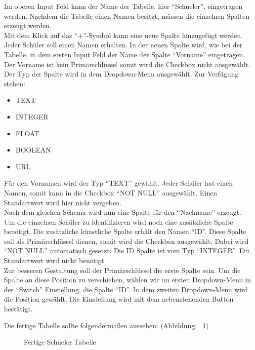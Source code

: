\begin{description}
Im oberen Input Feld kann der Name der Tabelle, hier ``Schueler'', eingetragen werden. Nachdem die Tabelle einen Namen besitzt, müssen die einzelnen Spalten erzeugt werden. \\
Mit dem Klick auf das ``+''-Symbol kann eine neue Spalte hinzugefügt werden. Jeder Schüler soll einen Namen erhalten. 
In der neuen Spalte wird, wie bei der Tabelle, in dem ersten Input Feld der Name der Spalte ``Vorname'' eingetragen. Der Vorname ist kein Primärschlüssel somit wird die Checkbox nicht ausgewählt. Der Typ der Spalte wird in dem Dropdown-Menu ausgewählt. Zur Verfügung stehen:
\begin{itemize}
    \item TEXT
    \item INTEGER
    \item FLOAT
    \item BOOLEAN
    \item URL
\end{itemize} 
Für den Vornamen wird der Typ ``TEXT'' gewählt.
Jeder Schüler hat einen Namen, somit kann in die Checkbox ``NOT NULL'' ausgewählt. Einen Standartwert wird hier nicht vergeben. \\
Nach dem gleichen Schema wird nun eine Spalte für den ``Nachname'' erzeugt.
Um die einzelnen Schüler zu identifizieren wird noch eine zusätzliche Spalte benötigt.
Die zusätzliche künstliche Spalte erhält den Namen ``ID''. Diese Spalte soll als Primärschlüssel dienen, somit wird die Checkbox ausgewählt. Dabei wird ``NOT NULL'' automatisch gesetzt. Die ID Spalte ist vom Typ ``INTEGER''. Ein Standartwert wird nicht benötigt. \\
Zur besseren Gestaltung soll der Primärschlüssel die erste Spalte sein. Um die Spalte an diese Position zu verschieben, wählen wir im ersten Dropdown-Menu in der ``Switch'' Einstellung, die Spalte ``ID''. In dem zweiten Dropdown-Menu wird die Position gewählt. Die Einstellung wird mit dem nebenstehenden Button bestätigt.

Die fertige Tabelle sollte folgendermaßen aussehen: (Abbildung: ~\ref{pic:table-schueler})

\begin{figure}[ht]
        \centering
        \caption{Fertige Schueler Tabelle}
        \label{pic:table-schueler}
\end{figure}


\end{description}
